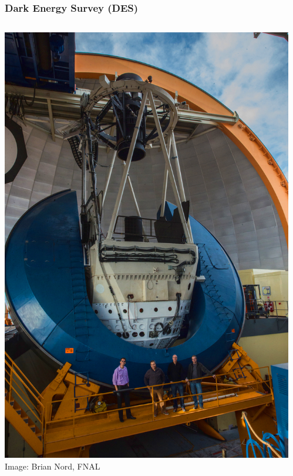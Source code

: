 \documentclass{beamer}
\begin{document}
\frame
{

    \frametitle{Dark Energy Survey (DES)}

    \fontsize{9}{0.8\baselineskip}

    \begin{columns}

        \begin{column}{0.4\textwidth}
            \includegraphics[scale=0.17]{ctio_blanco_crew_2013Oct-30-small-balance.jpg}
            \newline
            \hfill {\tiny Image: Brian Nord, FNAL}
        \end{column}


        \begin{column}{0.6\textwidth}

            \begin{itemize}


\end{itemize}
\end{column}
\end{columns}}
\end{document}
